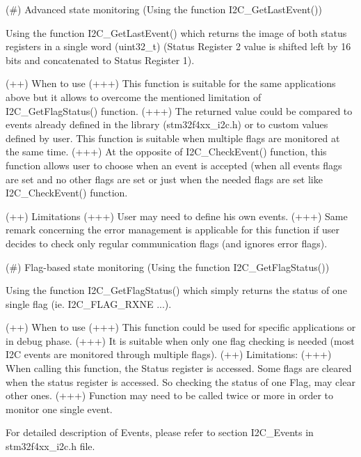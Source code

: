 \begin{DoxyVerb}
 
     (#) Advanced state monitoring (Using the function I2C_GetLastEvent())

        Using the function I2C_GetLastEvent() which returns the image of both status 
        registers in a single word (uint32_t) (Status Register 2 value is shifted left 
        by 16 bits and concatenated to Status Register 1).

          (++) When to use
             (+++) This function is suitable for the same applications above but it 
               allows to overcome the mentioned limitation of I2C_GetFlagStatus() 
               function.
             (+++) The returned value could be compared to events already defined in 
               the library (stm32f4xx_i2c.h) or to custom values defined by user.
               This function is suitable when multiple flags are monitored at the 
               same time.
             (+++) At the opposite of I2C_CheckEvent() function, this function allows 
               user to choose when an event is accepted (when all events flags are 
               set and no other flags are set or just when the needed flags are set 
               like I2C_CheckEvent() function.

          (++) Limitations
             (+++) User may need to define his own events.
             (+++) Same remark concerning the error management is applicable for this 
               function if user decides to check only regular communication flags 
               (and ignores error flags).
      
 
     (#) Flag-based state monitoring (Using the function I2C_GetFlagStatus())
     
      Using the function I2C_GetFlagStatus() which simply returns the status of 
      one single flag (ie. I2C_FLAG_RXNE ...). 

          (++) When to use
             (+++) This function could be used for specific applications or in debug 
               phase.
             (+++) It is suitable when only one flag checking is needed (most I2C 
               events are monitored through multiple flags).
          (++) Limitations: 
             (+++) When calling this function, the Status register is accessed. 
               Some flags are cleared when the status register is accessed. 
               So checking the status of one Flag, may clear other ones.
             (+++) Function may need to be called twice or more in order to monitor 
               one single event.
 
   For detailed description of Events, please refer to section I2C_Events in 
   stm32f4xx_i2c.h file.\end{DoxyVerb}
 

